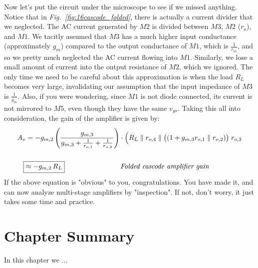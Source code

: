 Now let's put the circuit under the microscope to see if we missed anything.  Notice that in \emph{Fig.~\ref{fig:16cascode_folded}}, there is actually a current divider that we neglected.  The AC current generated by $M2$ is divided between $M3$, $M2$ ($r_o$), and $M1$.  We tacitly assumed that $M3$ has a much higher input conductance (approximately $g_m$) compared to the output conductance of $M1$, which is $\frac{1}{r_{o1}}$, and so we pretty much neglected the AC current flowing into $M1$.  Similarly, we lose a small amount of current into the output resistance of $M2$, which we ignored.  The only time we need to be careful about this approximation is when the load $R_L$ becomes very large, invalidating our assumption that the input impedance of $M3$ is $\frac{1}{g_m}$.  Also, if you were wondering, since $M1$ is not diode connected, its current is not mirrored to $M5$, even though they have the same $v_{gs}$.  Taking this all into consideration, the gain of the amplifier is given by:
    \begin{align}
        A_v &= -g_{m,2}\left(\frac{g_{m,3}}{g_{m,3} + \frac{1}{r_{o,1}} + \frac{1}{r_{o,2}}}\right)
                    \cdot \Big(R_L \parallel r_{o,4} \parallel \big((1 + g_{m,3} r_{o,1} \parallel r_{o,2})\big)\;r_{o,3}\\[0.5cm]
        \Aboxed{&\approx -g_{m,2}\,R_L}
        \text{\qquad\qquad\qquad\qquad}\textit{Folded cascode amplifier gain}
        \label{eq:folded_cascode_gain}
    \end{align} 
If the above equation is "obvious" to you, congratulations.  You have made it, and can now analyze multi-stage amplifiers by "inspection".  If not, don't worry, it just takes some time and practice.
\newpage
\section{Chapter Summary}
In this chapter we ...


